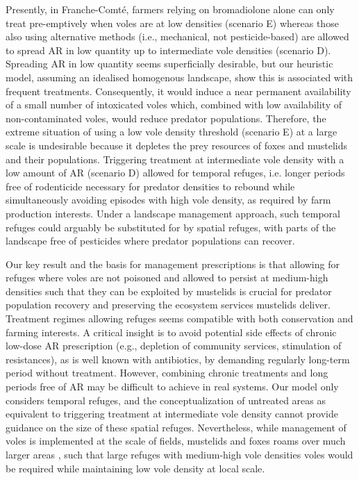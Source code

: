 \documentclass[11pt]{article}
\begin{document}
Presently, in Franche-Comté, farmers relying on bromadiolone alone can only treat pre-emptively when voles are at low densities (scenario E) whereas those also using alternative methods (i.e., mechanical, not pesticide-based) are allowed to spread AR in low quantity up to intermediate vole densities (scenario D).
%
Spreading AR in low quantity seems superficially desirable, but our heuristic model, assuming an idealised homogenous landscape, show this is associated with frequent treatments. Consequently, it would induce a near permanent availability of a small number of intoxicated voles which, combined with low availability of non-contaminated voles, would reduce predator populations.
%
Therefore, the extreme situation of using a low vole density threshold (scenario E) at a large scale is undesirable because it depletes the prey resources of foxes and mustelids and their populations.
%
Triggering treatment at intermediate vole density with a low amount of AR (scenario D) allowed for temporal refuges, i.e. longer periods free of rodenticide necessary for predator densities to rebound while simultaneously avoiding episodes with high vole density, as required by farm production interests. Under a landscape management approach, such temporal refuges could arguably be substituted for by spatial refuges, with parts of the landscape free of pesticides where predator populations can recover.

Our key result and the basis for management prescriptions is that allowing for refuges where voles are not poisoned and allowed to persist at medium-high densities such that they can be exploited by mustelids is crucial for predator population recovery and preserving the ecosystem services mustelids deliver.
%
Treatment regimes allowing refuges seems compatible with both conservation and farming interests. A critical insight is to avoid potential side effects of chronic low-dose AR prescription (e.g., depletion of community services, stimulation of resistances), as is well known with antibiotics, by demanding regularly long-term period without treatment. However, combining chronic treatments and long periods free of AR may be difficult to achieve in real systems. Our model only considers temporal refuges, and the conceptualization of untreated areas as equivalent to triggering treatment at intermediate vole density cannot provide guidance on the size of these spatial refuges. Nevertheless, while management of voles is implemented at the scale of fields, mustelids and foxes roams over much larger areas  \citep{King2006}, such that large refuges with medium-high vole densities voles would be required while maintaining low vole density at local scale.
\end{document}
